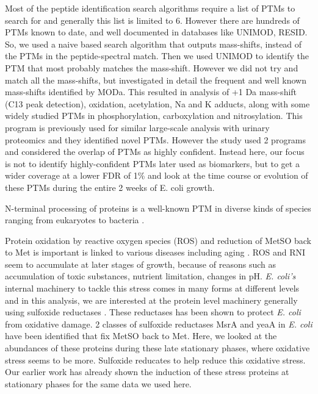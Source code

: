 \documentclass[12pt]{article}
\begin{document}
Most of the peptide identification search algorithms require a list of PTMs to search for and generally this list is limited to 6. However there are hundreds of PTMs known to date, and well documented in databases like UNIMOD, RESID. So, we used a naive based search algorithm that outputs mass-shifts, instead of the PTMs in the peptide-spectral match. Then we used UNIMOD to identify the PTM that most probably matches the mass-shift. However we did not try and match all the mass-shifts, but investigated in detail the frequent and well known mass-shifts identified by MODa. This resulted in analysis of +1 Da mass-shift (C13 peak detection), oxidation, acetylation, Na and K adducts, along with some widely studied PTMs in phosphorylation, carboxylation and nitrosylation. This program is previously used for similar large-scale analysis with urinary proteomics and they identified novel PTMs. However the study used 2 programs and considered the overlap of PTMs as highly confident. Instead here, our focus is not to identify highly-confident PTMs later used as biomarkers, but to get a wider coverage at a lower FDR of 1\% and look at the time course or evolution of these PTMs during the entire 2 weeks of E. coli growth.

N-terminal processing of proteins is a well-known PTM in diverse kinds of species ranging from eukaryotes to bacteria \cite{Kimuraetal2003}. 

Protein oxidation by reactive oxygen species (ROS) and reduction of MetSO back to Met is important is linked to various diseases including aging \cite{Stadtman1992}. ROS and RNI seem to accumulate at later stages of growth, because of reasons such as accumulation of toxic substances, nutrient limitation, changes in pH. \emph{E. coli's} internal machinery to tackle this stress comes in many forms at different levels and in this analysis, we are interested at the protein level machinery generally using sulfoxide reductases \cite{Brotetal1981} \cite{ZhangWeissbach2008}. These reductases has been shown to protect \emph{E. coli} from oxidative damage\cite{Ezratyetal2004}. 2 classes of sulfoxide reductases MsrA and yeaA in \emph{E. coli} have been identified that fix MetSO back to Met. Here, we looked at the abundances of these proteins during these late stationary phases, where oxidative stress seems to be more. Sulfoxide reducates to help reduce this oxidative stress. Our earlier work has already shown the induction of these stress proteins at stationary phases for the same data we used here.
\end{document}
